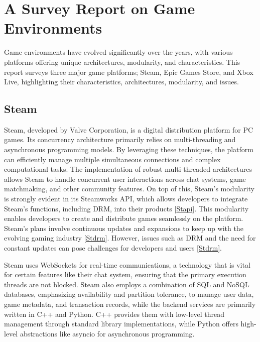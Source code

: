 \documentclass[]{final}
\begin{document}
\chapter{A Survey Report on Game Environments}

\label{survey}

Game environments have evolved significantly over the years, with various platforms
offering unique architectures, modularity, and characteristics. This report surveys
three major game platforms; Steam, Epic Games Store, and Xbox Live, highlighting
their characteristics, architectures, modularity, and issues.

\section{Steam}
Steam, developed by Valve Corporation, is a digital distribution platform
for PC games. Its concurrency architecture primarily relies on multi-threading and asynchronous
programming models. By leveraging these techniques, the platform can efficiently manage
multiple simultaneous connections and complex computational tasks. The implementation
of robust multi-threaded architectures allows Steam to handle concurrent user interactions
across chat systems, game matchmaking, and other community features. On top of this,
Steam's modularity is strongly evident in its Steamworks API, which allows developers to
integrate Steam's functions, including DRM, into their products \cite{simmons_decoding_2023} [\href{https://partner.steamgames.com/doc/sdk/api}{Stapi}].
This modularity enables developers to create and distribute games seamlessly on the platform.
Steam's plans involve continuous updates and expansions to keep up with
the evolving gaming industry [\href{https://partner.steamgames.com/doc/features/drm}{Stdrm}]. However, issues such as DRM and the need for
constant updates can pose challenges for developers and users [\href{https://partner.steamgames.com/doc/features/drm}{Stdrm}].

Steam uses WebSockets for real-time communications, a technology that is vital
for certain features like their chat system, ensuring that the primary execution threads are not blocked.\cite{noauthor_isteamnetworkingsockets_nodate}
Steam also employs a combination of SQL and NoSQL databases\cite{simmons_decoding_2023, djundik_how_2017}, emphasizing availability
and partition tolerance, to manage user data, game metadata, and transaction records, while
the backend services are primarily written in C++ and Python.\cite{simmons_decoding_2023}  C++ provides them with low-level thread management through standard
library implementations, while Python offers high-level abstractions like asyncio
for asynchronous programming.
\end{document}
